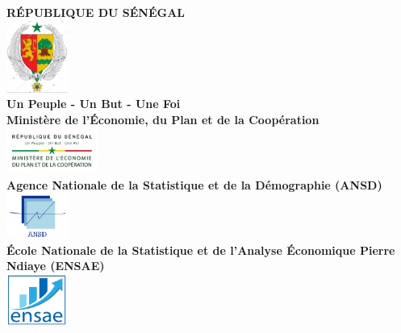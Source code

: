 \documentclass[
]{article}
\author{}
\date{\vspace{-2.5em}}
\begin{document}
\begin{titlepage}
    \thispagestyle{empty}
    

    \vspace*{-1cm}
    \begin{center}
        \textbf{\LARGE\color{ensaeblue} RÉPUBLIQUE DU SÉNÉGAL}\\[0.1cm]
        \includegraphics[width=2cm]{images/Logo1.jpg} \\[0.1cm]
        \textbf{\large\color{goldaccent} Un Peuple - Un But - Une Foi}\\[0.5cm]
        
        \textbf{\LARGE\color{ensaeblue} Ministère de l'Économie, du Plan et de la Coopération}\\[0.1cm]
        \includegraphics[width=3cm]{images/Logo2.png} \\[0.5cm] 
        
        \textbf{\large\color{black} Agence Nationale de la Statistique et de la Démographie (ANSD)}\\[0.2cm]
        
        \includegraphics[width=2cm]{images/Logo3.png} \\[0.5cm]  
        
        \textbf{\large\color{black} École Nationale de la Statistique et de l'Analyse Économique Pierre Ndiaye (ENSAE)}\\[0.4cm]
        \includegraphics[width=2cm]{images/Logo4.png} \\[0.7cm]
    \end{center}
    

\end{titlepage}
\end{document}
